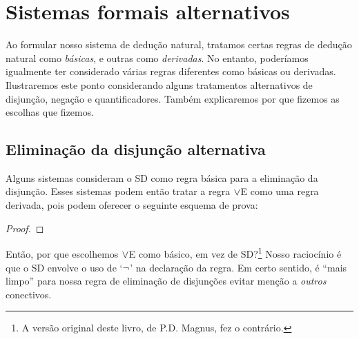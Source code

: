 
\chapter{Sistemas formais alternativos}
Ao formular nosso sistema de dedução natural, tratamos certas regras de dedução natural como \emph{básicas}, e outras como \emph{derivadas}. No entanto, poderíamos igualmente ter considerado várias regras diferentes como básicas ou derivadas. Ilustraremos este ponto considerando alguns tratamentos alternativos de disjunção, negação e quantificadores. Também explicaremos por que fizemos as escolhas que fizemos. 

\section{Eliminação da disjunção alternativa}
Alguns sistemas consideram o SD como regra básica para a eliminação da disjunção. Esses sistemas podem então tratar a regra $\vee$E como uma regra derivada, pois podem oferecer o seguinte esquema de prova: 
\begin{proof}
  \open
     {}
  \close
  \open
  \close
  \open
    \open
    \close
  \close
\end{proof}
Então, por que escolhemos $\vee$E como básico, em vez de SD?\footnote{A versão original deste livro, de P.D. Magnus, fez o contrário.} Nosso raciocínio é que o SD envolve o uso de `$\neg$' na declaração da regra. Em certo sentido, é ``mais limpo'' para nossa regra de eliminação de disjunções evitar menção a \emph{outros} conectivos. 

